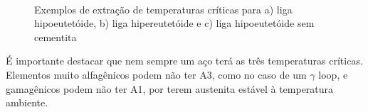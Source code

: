 \documentclass[brazil,tf,epusp]{usp}  %
\begin{document}
\begin{figure}
  \hfill
  \\
  \caption{Exemplos de extração de temperaturas críticas para a) liga hipoeutetóide, b) liga hipereutetóide e c) liga hipoeutetóide sem cementita}
  \label{fig:Tcrit_exemplos}
\end{figure}

É importante destacar que nem sempre um aço terá as três temperaturas críticas. Elementos muito alfagênicos podem não ter A3, como no caso de um $\gamma$ loop, e gamagênicos podem não ter A1, por terem austenita estável à temperatura ambiente.
\end{document}
